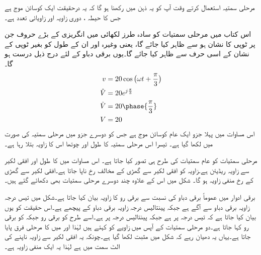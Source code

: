 مرحلی سمتیہ استعمال کرتے وقت آپ کو یہ ذہن میں رکھنا ہو گا کہ یہ درحقیقت ایک کوسائن موج ہے جس کا حیطہ   ، دوری زاویہ  اور زاویائی تعدد  ہے۔

اس کتاب میں مرحلی سمتیات کو سادہ طرز لکھائی میں انگریزی کے بڑے حروف جن پر ٹوپی کا نشان ہو سے ظاہر کیا جائے گا، یعنی   وغیرہ اور ان کے طول کو بغیر ٹوپی کے نشان کے اسی حرف سے ظاہر کیا جائے گا۔یوں برقی دباو  کے لئے درج ذیل درست ہو گا۔
\begin{gather}
\begin{aligned}
v&=20 \cos \big(\omega t +\frac{\pi}{3}\big)\\
\hat{V}&=20 e^{j \frac{\pi}{3}}\\
\hat{V}&=20 \phase{\frac{\pi}{3}}\\
V&=20
\end{aligned}
\end{gather}
اس مساوات میں پہلا جزو ایک عام کوسائن موج ہے جس کو دوسرے جزو میں مرحلی سمتیہ کی صورت میں لکھا گیا ہے۔ تیسرا اس مرحلی سمتیہ کا طول اور چوتھا اس کا زاویہ بتلا رہا ہے۔

مرحلی سمتیات کو عام سمتیات کی طرح ہی تصور کیا جاتا ہے۔ اس مساوات میں  کا طول  اور افقی لکیر سے زاویہ   ریڈیئن ہے۔زاویہ  کو افقی لکیر سے گھڑی کے مخالف رخ ناپا جاتا ہے۔افقی لکیر سے گھڑی کے رخ  منفی زاویہ ہو گا۔ شکل  میں اس  کے علاوہ چند دوسرے  مرحلی سمتیات بھی  دکھائے گئے ہیں۔


برقی ادوار میں عموماً برقی دباو  کی نسبت سے  برقی رو   کا زاویہ بیان کیا جاتا ہے۔شکل    میں  تیس درجہ زاویہ برقی دباو سے آگے ہے جبکہ    پینتالیس درجہ زاویہ برقی دباو کے  پیچھے  ہے۔اس حقیقت کو یوں بیان کیا جاتا ہے کہ  تیس درجہ   پر  ہے جبکہ   پینتالیس درجہ   پر ہے۔اسے طرح  کو  برقی رو جبکہ  کو  برقی رو کہا جاتا ہے۔دو مرحلی سمتیات کے آپس میں زاویے کو  کہتے ہیں لہٰذا  اور  میں  کا مرحلی فرق پایا جاتا ہے۔یہاں یہ دھیان رہے کہ شکل میں   مثبت لکھا گیا ہے۔چونکہ یہ افقی لکیر سے زاویہ ناپنے کی الٹ سمت میں ہے لہٰذا یہ ایک منفی زاویہ ہے۔

